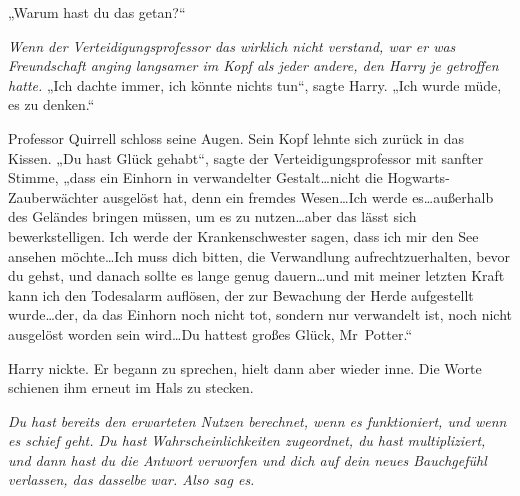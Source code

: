 „Warum hast du das getan?“

\emph{Wenn der Verteidigungsprofessor das wirklich nicht verstand, war er was Freundschaft anging langsamer im Kopf als jeder andere, den Harry je getroffen hatte.}
„Ich dachte immer, ich könnte nichts tun“, sagte Harry. „Ich wurde müde, es zu denken.“

Professor Quirrell schloss seine Augen. Sein Kopf lehnte sich zurück in das Kissen.
„Du hast Glück gehabt“, sagte der Verteidigungsprofessor mit sanfter Stimme,
„dass ein Einhorn in verwandelter Gestalt…nicht die Hogwarts-Zauberwächter ausgelöst hat, denn ein fremdes Wesen…Ich werde es…außerhalb des Geländes bringen müssen, um es zu nutzen…aber das lässt sich bewerkstelligen. Ich werde der Krankenschwester sagen, dass ich mir den See ansehen möchte…Ich muss dich bitten, die Verwandlung aufrechtzuerhalten, bevor du gehst, und danach sollte es lange genug dauern…und mit meiner letzten Kraft kann ich den Todesalarm auflösen, der zur Bewachung der Herde aufgestellt wurde…der, da das Einhorn noch nicht tot, sondern nur verwandelt ist, noch nicht ausgelöst worden sein wird…Du hattest großes Glück, Mr~Potter.“

Harry nickte. Er begann zu sprechen, hielt dann aber wieder inne. Die Worte schienen ihm erneut im Hals zu stecken.

\emph{Du hast bereits den erwarteten Nutzen berechnet, wenn es funktioniert, und wenn es schief geht. Du hast Wahrscheinlichkeiten zugeordnet, du hast multipliziert, und dann hast du die Antwort verworfen und dich auf dein neues Bauchgefühl verlassen, das dasselbe war. Also sag es.}

